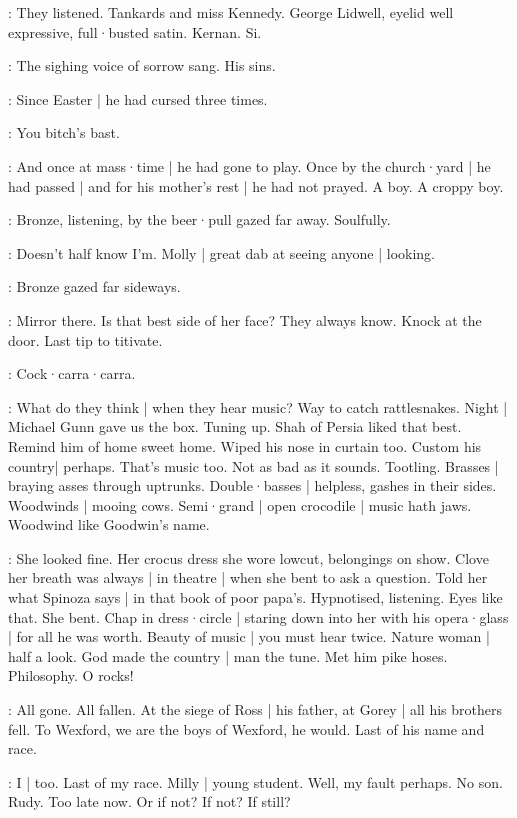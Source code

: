 :
They listened.
Tankards and miss Kennedy.
George Lidwell,
eyelid well expressive,
full·busted satin.
Kernan.
Si.

:
The sighing voice of sorrow sang.
His sins.

:
Since Easter |
he had cursed three times.

:
You bitch's bast.

:
And once at mass·time |
he had gone to play.
Once by the church·yard |
he had passed |
and for his mother's rest |
he had not prayed.
A boy.
A croppy boy.

:
Bronze,
listening,
by the beer·pull gazed far away.
Soulfully.

\BloomInt:
Doesn't half know I'm.
Molly |
great dab at seeing anyone |
looking.

:
Bronze gazed far sideways.

\BloomInt:
Mirror there.
Is that best side of her face?
They always know.
Knock at the door.
Last tip to titivate.

\BloomInt:
Cock·carra·carra.

\BloomInt:
What do they think |
when they hear music?
Way to catch rattle\-snakes.
Night |
Michael Gunn gave us the box.
Tuning up.
Shah of Persia liked that best.
Remind him of home sweet home.
Wiped his nose in curtain too.
Custom his country|
perhaps.
That's music too.
Not as bad as it sounds.
Tootling.
Brasses |
braying asses through uptrunks.
Double·basses |
helpless,
gashes in their sides.
Woodwinds |
mooing cows.
Semi·grand |
open crocodile |
music hath jaws.
Woodwind like Goodwin's name.

\BloomInt:
She looked fine.
Her crocus dress she wore lowcut,
belongings on show.
Clove her breath was always |
in theatre |
when she bent to ask a question.
Told her what Spinoza says |
in that book of poor papa's.
Hypnotised,
listening.
Eyes like that.
She bent.
Chap in dress·circle |
staring down into her with his opera·glass |
for all he was worth.
Beauty of music |
you must hear twice.
Nature woman |
half a look.
God made the country |
man the tune.
Met him pike hoses.
Philosophy.
O rocks!

:
All gone.
All fallen.
At the siege of Ross |
his father,
at Gorey |
all his brothers fell.
To Wexford,
we are the boys of Wexford,
he would.
Last of his name and race.

\BloomInt:
I |
too.
Last of my race.
Milly |
young student.
Well,
my fault perhaps.
No son.
Rudy.
Too late now.
Or if not?
If not?
If still?

